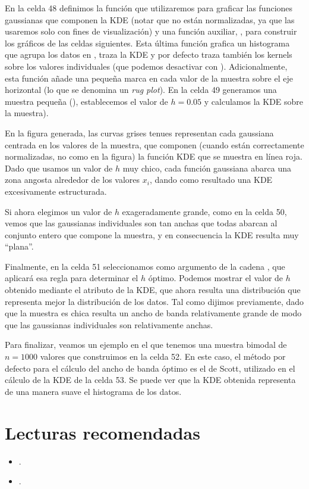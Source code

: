 En la celda 48 definimos la función  que utilizaremos para graficar las funciones gaussianas que componen la KDE (notar que no están normalizadas, ya que las usaremos solo con fines de visualización) y una función auxiliar, , para construir los gráficos de las celdas siguientes. Esta última función grafica un histograma que agrupa los datos en , traza la KDE y por defecto traza también los kernels sobre los valores individuales (que podemos desactivar con ). Adicionalmente, esta función añade una pequeña marca en cada valor de la muestra sobre el eje horizontal (lo que se denomina un \textit{rug plot}). En la celda 49 generamos una muestra pequeña (), establecemos el valor de $h = 0.05$ y calculamos la KDE sobre la muestra).


En la figura generada, las curvas grises tenues representan cada gaussiana centrada en los valores de la muestra, que componen (cuando están correctamente normalizadas, no como en la figura) la función KDE que se muestra en línea roja. Dado que usamos un valor de $h$ muy chico, cada función gaussiana abarca una zona angosta alrededor de los valores $x_i$, dando como resultado una KDE excesivamente estructurada.

Si ahora elegimos un valor de $h$ exageradamente grande, como en la celda 50, vemos que las gaussianas individuales son tan anchas que todas abarcan al conjunto entero que compone la muestra, y en consecuencia la KDE resulta muy ``plana''.


Finalmente, en la celda 51 seleccionamos como argumento de  la cadena , que aplicará esa regla para determinar el $h$ óptimo. Podemos mostrar el valor de $h$ obtenido mediante el atributo  de la KDE, que ahora resulta una distribución que representa mejor la distribución de los datos. Tal como dijimos previamente, dado que la muestra es chica resulta un ancho de banda relativamente grande de modo que las gaussianas individuales son relativamente anchas.


Para finalizar, veamos un ejemplo en el que tenemos una muestra bimodal de $n = 1000$ valores que construimos en la celda 52. En este caso, el método por defecto para el cálculo del ancho de banda óptimo es el de Scott, utilizado en el cálculo de la KDE de la celda 53. Se puede ver que la KDE obtenida representa de una manera suave el histograma de los datos.


\section{Lecturas recomendadas}
\begin{itemize}
 \item {}.
 \item {}.
\end{itemize}

